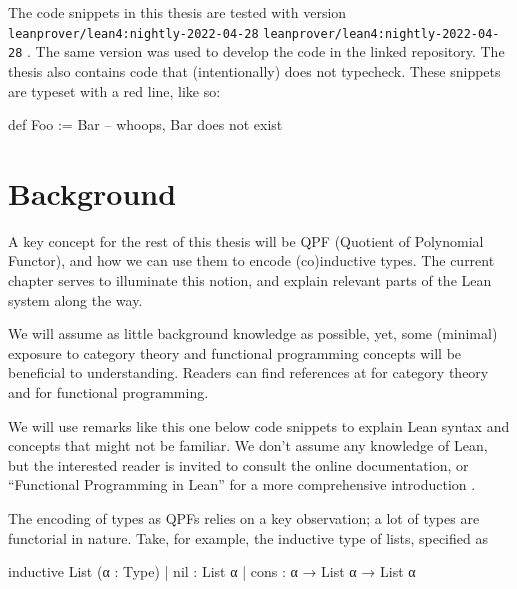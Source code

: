 \documentclass[titlepage]{report}
\newenvironment{remark}{%
\begin{framed}
\begin{trivlist}
    \item[\hskip \labelsep {\bfseries Remark:}]}%
{%
\end{trivlist}%
\end{framed}
}
\newenvironment{todo}{%
\definecolor{shadecolor}{HTML}{F8E0E0}%
\begin{shaded}%
\begin{trivlist}                         
    \item[\hskip \labelsep {\bfseries Todo:}]}{\end{trivlist}\end{shaded}}
\newcommand\lean[1]{%
\ifx\leanmode\undefined%
\def\leanmode{1}%
\texttt{\small #1}%
\undef\leanmode%
\else%
\texttt{#1}%
\fi%
}
\begin{document}
The code snippets in this thesis are tested with version \lean{leanprover/lean4:nightly-2022-04-28}. The same version was used to develop the code in the linked repository.
The thesis also contains code that (intentionally) does not typecheck. These snippets are typeset with a red line, like so:
\begin{badleancode}

    def Foo := Bar -- whoops, Bar does not exist

\end{badleancode}









\chapter{Background}
\label{ch:background}

A key concept for the rest of this thesis will be QPF (Quotient of Polynomial Functor), and how we can use them to encode (co)inductive types. The current chapter serves to illuminate this notion, and explain relevant parts of the Lean system along the way.

We will assume as little background knowledge as possible, yet, some (minimal) exposure to category theory and functional programming concepts will be beneficial to understanding. Readers can find references at \cite{awodeyCategoryTheory2010, milewskiCategoryTheoryProgrammers} for category theory and \cite{christiansenFunctionalProgrammingLean} for functional programming.


\begin{remark}
    We will use remarks like this one below code snippets to explain Lean syntax and concepts that might not be familiar. We don't assume any knowledge of Lean, but the interested reader is invited to consult the online documentation, or ``Functional Programming in Lean'' for a more comprehensive introduction
    \cite{avigadTheoremProvingLean,christiansenFunctionalProgrammingLean}.
\end{remark}



The encoding of types as QPFs relies on a key observation; a lot of types are functorial in nature.
Take, for example, the inductive type of lists, specified as
\begin{leancode}
    inductive List (α : Type)
    | nil  : List α
    | cons : α → List α → List α
\end{leancode}
\end{document}

